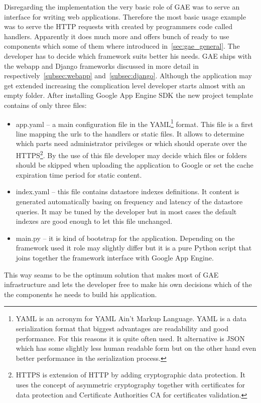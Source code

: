 Disregarding the implementation the very basic role of GAE was to serve an interface for writing web applications. Therefore the most basic usage example was to serve the HTTP requests with created by programmers code called handlers.  Apparently it does much more and offers bunch of ready to use components which some of them where introduced in~\ref{sec:gae_general}. The developer has to decide which framework suits better his needs. GAE ships with the webapp and Django frameworks discussed in more detail in respectively~\ref{subsec:webapp} and~\ref{subsec:django}. Although the application may get extended increasing the complication level developer starts almost with an empty folder. After installing Google App Engine SDK the new project template contains of only three files:
\begin{itemize}
\item{app.yaml} -- a main configuration file in the YAML\footnote{YAML is an  acronym for YAML Ain't Markup Language. YAML is a data serialization format that biggest advantages are readability and good performance. For this reasons it is quite often used. It alternative is JSON which has some slightly less human readable form but on the other hand even better performance in the serialization process.} format. This file is a first line mapping the urls to the handlers or static files. It allows to determine which parts need administrator privileges or which should operate over the HTTPS\footnote{HTTPS is extension of HTTP by adding cryptographic data protection. It uses the concept of asymmetric cryptography together with certificates for data protection and Certificate Authorities CA for certificates validation.}. By the use of this file developer may decide which files or folders should be skipped when uploading the application to Google or set the cache expiration time period for static content.   
\item{index.yaml} -- this file contains datastore indexes definitions. It content is generated automatically basing on frequency and latency of the datastore queries. It may be tuned by the developer but in most cases the default indexes are good enough to let this file unchanged.    
\item{main.py} -- it is kind of bootstrap for the application. Depending on the framework used it role may slightly differ but it is a pure Python script that joins together the framework interface with Google App Engine.  
\end{itemize}
This way seams to be the optimum solution that makes most of GAE infrastructure and lets the developer free to make his own decisions which of the the components he needs to build his application.
